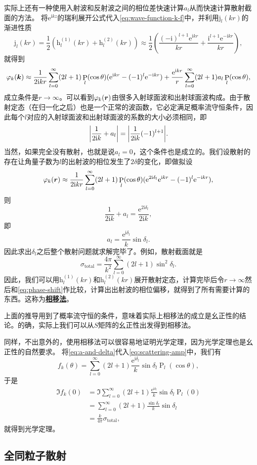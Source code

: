 \documentclass[UTF8, a4paper]{ctexart}
\newcommand*{\ee}{\mathrm{e}}
\newcommand*{\ii}{\mathrm{i}}
\DeclareMathOperator{\legpoly}{P}
\newcommand*{\hankelone}{\mathrm{h}^{(1)}}
\newcommand*{\hankeltwo}{\mathrm{h}^{(2)}}
\newcommand{\concept}[1]{\underline{\textbf{#1}}}
\begin{document}
实际上还有一种使用入射波和反射波之间的相位差快速计算$a_l$从而快速计算散射截面的方法。
将$\ee^{\ii k z}$的瑞利展开公式代入\eqref{eq:wave-function-k-f}中，并利用$\mathrm{j}_l(kr)$的渐进性质
\[
    \mathrm{j}_l(kr) = \frac{1}{2} (\hankelone_l(kr) + \hankeltwo_l(kr)) \approx \frac{1}{2} \left( \frac{(-\ii)^{l+1} \ee^{\ii k r}}{kr} + \frac{\ii^{l+1} \ee^{- \ii k r}}{kr} \right),
\]
就得到
\[
    \varphi_k(\vb*{k}) \approx \frac{1}{2\ii k r} \sum_{l=0}^\infty (2l+1) \legpoly_l(\cos \theta) (\ee^{\ii k r} - (-1)^l \ee^{- \ii k r}) + \frac{\ee^{\ii k r}}{r} \sum_{l=0}^\infty (2l+1) a_l \legpoly_l(\cos \theta),
\]
成立条件是$r \to \infty$。可以看到$\varphi_k(\vb*{r})$由很多入射球面波和出射球面波构成。由于散射定态（在归一化之后）也是一个正常的波函数，它必定满足概率流守恒条件，因此每个$l$对应的入射球面波和出射球面波的系数的大小必须相同，即
\[
    \abs{\frac{1}{2\ii k} + a_l} = \abs{\frac{1}{2\ii k} (-1)^{l+1}}.
\]
当然，如果完全没有散射，也就是说$a_l=0$，这个条件也是成立的。我们设散射的存在让角量子数为$l$的出射波的相位发生了$2\delta$的变化，即做拟设
\begin{equation}
    \varphi_k(\vb*{r}) \approx \frac{1}{2\ii k r} \sum_{l=0}^\infty (2l+1) \legpoly_l(\cos \theta) (\ee^{2\ii \delta_l} \ee^{\ii k r} - (-1)^l \ee^{- \ii k r}),
    \label{eq:phase-shift}
\end{equation}
则
\[
    \frac{1}{2\ii k} + a_l = \frac{\ee^{2\ii \delta_l}}{2\ii k},
\]
即
\begin{equation}
    a_l = \frac{\ee^{\ii \delta_l}}{k} \sin \delta_l.
    \label{eq:a-and-delta}
\end{equation}
因此求出$\delta_l$之后整个散射问题就求解完毕了。例如，散射截面就是
\begin{equation}
    \sigma_\text{total} = \frac{4\pi}{k^2} \sum_{l=0}^\infty (2l+1) \sin^2 \delta_l.
\end{equation}
因此，我们可以用$\hankelone_l(kr)$和$\hankeltwo_l(kr)$展开散射定态，计算完毕后令$r\to \infty$然后和\eqref{eq:phase-shift}作比较，计算出出射波的相位偏移，就得到了所有需要计算的东西。这称为\concept{相移法}。

上面的推导用到了概率流守恒的条件，意味着实际上相移法的成立是幺正性的结论。的确，实际上我们可以从$S$矩阵的幺正性出发得到相移法。

同样，不出意外的，使用相移法可以很容易地证明光学定理，因为光学定理也是幺正性的自然要求。
将\eqref{eq:a-and-delta}代入\eqref{eq:scattering-amp}中，我们有
\[
    f_k(\theta) = \sum_{l=0}^\infty (2l+1) \frac{\ee^{\ii \delta_l}}{k} \sin \delta_l \legpoly_l(\cos \theta),
\]
于是
\[
    \begin{aligned}
        \Im f_k(0) &= \Im \sum_{l=0}^\infty (2l+1) \frac{\ee^{\ii \delta_l}}{k} \sin \delta_l \legpoly_l(0) \\
        &= \sum_{l=0}^\infty (2l+1) \frac{\sin \delta_l}{k} \sin \delta_l \\
        &= \frac{k}{4\pi} \sigma_\text{total},
    \end{aligned}
\]
就得到光学定理。

\subsection{全同粒子散射}
\end{document}
